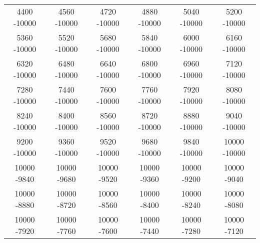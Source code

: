 \begin{landscape}
\begin{table}[]
\begin{tabular}{|cccccc|}
		4400 -10000 & 4560 -10000 & 4720 -10000 & 4880 -10000 & 5040 -10000 & 5200 -10000\\
		5360 -10000 & 5520 -10000 & 5680 -10000 & 5840 -10000 & 6000 -10000 & 6160 -10000\\
		6320 -10000 & 6480 -10000 & 6640 -10000 & 6800 -10000 & 6960 -10000 & 7120 -10000\\
		7280 -10000 & 7440 -10000 & 7600 -10000 & 7760 -10000 & 7920 -10000 & 8080 -10000\\
		8240 -10000 & 8400 -10000 & 8560 -10000 & 8720 -10000 & 8880 -10000 & 9040 -10000\\
		9200 -10000 & 9360 -10000 & 9520 -10000 & 9680 -10000 & 9840 -10000 & 10000 -10000\\
		10000 -9840 & 10000 -9680 & 10000 -9520 & 10000 -9360 & 10000 -9200 & 10000 -9040\\
		10000 -8880 & 10000 -8720 & 10000 -8560 & 10000 -8400 & 10000 -8240 & 10000 -8080\\
		10000 -7920 & 10000 -7760 & 10000 -7600 & 10000 -7440 & 10000 -7280 & 10000 -7120\\ \hline
        \end{tabular}
    \end{table}
\end{landscape}
